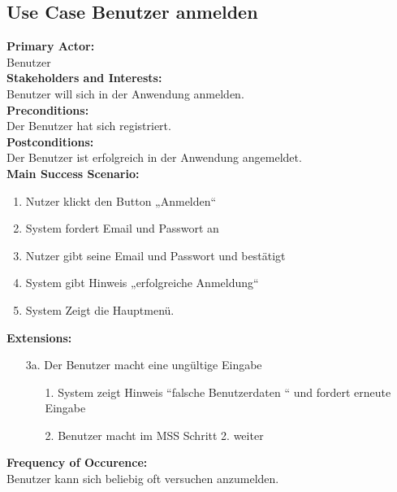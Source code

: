 \documentclass[12pt,a4paper,onecolumn]{article}
\begin{document}
\subsection{Use Case Benutzer anmelden}
\textbf{Primary Actor:}\\ Benutzer\\
\textbf{Stakeholders and Interests:}\\
Benutzer will sich in der Anwendung anmelden.\\
\textbf{Preconditions:} \\ Der Benutzer hat sich registriert.\\
\textbf{Postconditions:}\\ Der Benutzer ist erfolgreich in der Anwendung angemeldet.\\
\textbf{Main Success Scenario:}
\begin{enumerate}
    \item Nutzer klickt den Button „Anmelden“
    \item System fordert Email und Passwort an
    \item Nutzer gibt seine Email und Passwort und bestätigt 
    \item System gibt Hinweis „erfolgreiche Anmeldung“ 
    \item System Zeigt die Hauptmenü.
\end{enumerate}
\textbf{Extensions:}
\begin{enumerate}
    \item [3a.]  Der Benutzer macht eine ungültige Eingabe
    \begin{enumerate}
        \item[1.]System zeigt Hinweis “falsche Benutzerdaten “ und fordert erneute Eingabe
        \item[2.]Benutzer macht im MSS Schritt 2. weiter
    \end{enumerate}
\end{enumerate}
\textbf{Frequency of Occurence:}\\ Benutzer kann sich beliebig oft versuchen anzumelden.\\
\end{document}

